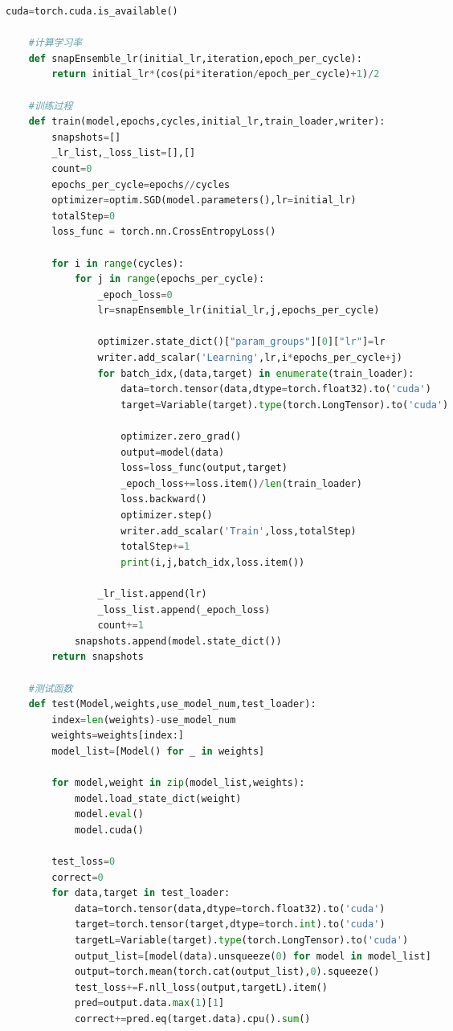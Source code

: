 \documentclass[supercite]{HustGraduPaper}
\begin{document}
\begin{sloppypar}
\begin{appendices}
\begin{spacing}{1.25}
\begin{lstlisting}[language=python]
    cuda=torch.cuda.is_available()
    
    #计算学习率
    def snapEnsemble_lr(initial_lr,iteration,epoch_per_cycle):
        return initial_lr*(cos(pi*iteration/epoch_per_cycle)+1)/2
    
    #训练过程
    def train(model,epochs,cycles,initial_lr,train_loader,writer):
        snapshots=[]
        _lr_list,_loss_list=[],[]
        count=0
        epochs_per_cycle=epochs//cycles
        optimizer=optim.SGD(model.parameters(),lr=initial_lr)
        totalStep=0
        loss_func = torch.nn.CrossEntropyLoss()
    
        for i in range(cycles):
            for j in range(epochs_per_cycle):
                _epoch_loss=0
                lr=snapEnsemble_lr(initial_lr,j,epochs_per_cycle)
    
                optimizer.state_dict()["param_groups"][0]["lr"]=lr
                writer.add_scalar('Learning',lr,i*epochs_per_cycle+j)
                for batch_idx,(data,target) in enumerate(train_loader):
                    data=torch.tensor(data,dtype=torch.float32).to('cuda')
                    target=Variable(target).type(torch.LongTensor).to('cuda')
    
                    optimizer.zero_grad()
                    output=model(data)
                    loss=loss_func(output,target)
                    _epoch_loss+=loss.item()/len(train_loader)
                    loss.backward()
                    optimizer.step()
                    writer.add_scalar('Train',loss,totalStep)
                    totalStep+=1
                    print(i,j,batch_idx,loss.item())
    
                _lr_list.append(lr)
                _loss_list.append(_epoch_loss)
                count+=1
            snapshots.append(model.state_dict())
        return snapshots
    
    #测试函数
    def test(Model,weights,use_model_num,test_loader):
        index=len(weights)-use_model_num
        weights=weights[index:]
        model_list=[Model() for _ in weights]
    
        for model,weight in zip(model_list,weights):
            model.load_state_dict(weight)
            model.eval()
            model.cuda()
    
        test_loss=0
        correct=0
        for data,target in test_loader:
            data=torch.tensor(data,dtype=torch.float32).to('cuda')
            target=torch.tensor(target,dtype=torch.int).to('cuda')
            targetL=Variable(target).type(torch.LongTensor).to('cuda')
            output_list=[model(data).unsqueeze(0) for model in model_list]
            output=torch.mean(torch.cat(output_list),0).squeeze()
            test_loss+=F.nll_loss(output,targetL).item()
            pred=output.data.max(1)[1]
            correct+=pred.eq(target.data).cpu().sum()
    

\end{lstlisting}
\end{spacing}
\end{appendices}
\end{sloppypar}
\end{document}
